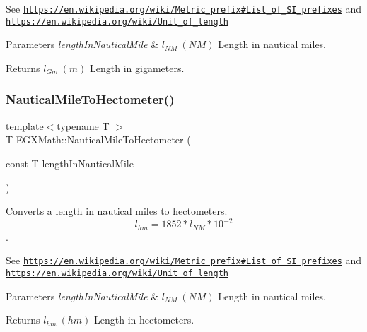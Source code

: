 See \href{https://en.wikipedia.org/wiki/Metric_prefix#List_of_SI_prefixes}{\tt https\+://en.\+wikipedia.\+org/wiki/\+Metric\+\_\+prefix\#\+List\+\_\+of\+\_\+\+S\+I\+\_\+prefixes} and \href{https://en.wikipedia.org/wiki/Unit_of_length}{\tt https\+://en.\+wikipedia.\+org/wiki/\+Unit\+\_\+of\+\_\+length} 
\begin{DoxyParams}{Parameters}
{\em length\+In\+Nautical\+Mile} & $ l_{NM}\ (NM)$ Length in nautical miles. \\
\hline
\end{DoxyParams}
\begin{DoxyReturn}{Returns}
$ l_{Gm}\ (m)$ Length in gigameters. 
\end{DoxyReturn}
\mbox{\label{group___e_g_x_math-_conversions-_length_conversions-_non-_s_i-_nautical_mile-_s_i_gab23b612d39bfe199f77deb6d8d3d044d}} 
\subsubsection{\texorpdfstring{Nautical\+Mile\+To\+Hectometer()}{NauticalMileToHectometer()}}
{\footnotesize\ttfamily template$<$typename T $>$ \\
T E\+G\+X\+Math\+::\+Nautical\+Mile\+To\+Hectometer (\begin{DoxyParamCaption}\item[{const T}]{length\+In\+Nautical\+Mile }\end{DoxyParamCaption})}



Converts a length in nautical miles to hectometers. \[ l_{hm}=1852 * l_{NM} * 10^{-2} \]. 

See \href{https://en.wikipedia.org/wiki/Metric_prefix#List_of_SI_prefixes}{\tt https\+://en.\+wikipedia.\+org/wiki/\+Metric\+\_\+prefix\#\+List\+\_\+of\+\_\+\+S\+I\+\_\+prefixes} and \href{https://en.wikipedia.org/wiki/Unit_of_length}{\tt https\+://en.\+wikipedia.\+org/wiki/\+Unit\+\_\+of\+\_\+length} 
\begin{DoxyParams}{Parameters}
{\em length\+In\+Nautical\+Mile} & $ l_{NM}\ (NM)$ Length in nautical miles. \\
\hline
\end{DoxyParams}
\begin{DoxyReturn}{Returns}
$ l_{hm}\ (hm)$ Length in hectometers. 
\end{DoxyReturn}
\mbox{\label{group___e_g_x_math-_conversions-_length_conversions-_non-_s_i-_nautical_mile-_s_i_ga3bdd35fac83cfac8d0f6cfc789d1c8f4}} 
